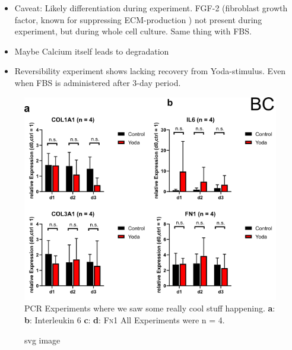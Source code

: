 \begin{itemize}
     \item  Caveat: Likely differentiation during experiment. FGF-2 (fibroblast growth factor, known for suppressing ECM-production ) not present during experiment, but during whole cell culture. Same thing with FBS. 
     
     \item Maybe Calcium itself leads to degradation
    
    \item Reversibility experiment shows lacking recovery from Yoda-stimulus. Even when FBS is administered after 3-day period.
\end{itemize}



\begin{figure}[ht]
    \centering
    \includegraphics[scale = 0.6]{Collection.png}
    \caption{
    PCR Experiments where we saw some really cool stuff happening.
    \textbf{a}: \colone{ }
    \textbf{b}: Interleukin 6
    \textbf{c}: \colthree{ }
    \textbf{d}: \textsc{Fn}1
    All Experiments were n = 4. 
    }
    \label{fig:my_label}
\end{figure}


\begin{figure}[htbp]
  \centering
  
  \caption{svg image}
\end{figure}



